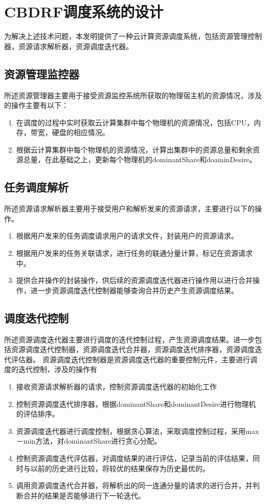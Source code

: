 \section{CBDRF调度系统的设计}
为解决上述技术问题，本发明提供了一种云计算资源调度系统，包括资源管理控制器，资源请求解析器，资源调度迭代器。

\subsection{资源管理监控器}
所述资源管理器主要用于接受资源监控系统所获取的物理宿主机的资源情况，涉及的操作主要有以下：
\begin{enumerate}
\item 在调度的过程中实时获取云计算集群中每个物理机的资源情况，包括CPU，内存，带宽，硬盘的相应情况。
\item 根据云计算集群中每个物理机的资源情况，计算出集群中的资源总量和剩余资源总量，在此基础之上，更新每个物理机的dominantShare和doaminDesire。
\end{enumerate}
\subsection{任务调度解析}
所述资源请求解析器主要用于接受用户和解析发来的资源请求，主要进行以下的操作。
\begin{enumerate}
\item 根据用户发来的任务调度请求用户的请求文件，封装用户的资源请求。
\item 根据用户发来的任务关联请求，进行任务的联通分量计算，标记在资源请求中。
\item 提供合并操作的封装操作，供后续的资源调度迭代器进行操作用以进行合并操作，进一步资源调度迭代控制器能够查询合并历史产生资源调度结果。
\end{enumerate}
\subsection{调度迭代控制}
所述资源调度迭代器主要进行调度的迭代控制过程，产生资源调度结果。进一步包括资源调度迭代控制器，资源调度迭代合并器，资源调度迭代排序器，资源调度迭代评估器。
资源调度迭代控制器是资源调度迭代器的重要控制元件，主要进行调度的迭代控制，涉及的操作有
\begin{enumerate}
\item 接收资源请求解析器的请求，控制资源调度迭代器的初始化工作
\item 控制资源调度迭代排序器，根据dominantShare和dominantDesire进行物理机的评估排序。
\item 资源调度迭代器进行调度控制，根据贪心算法，采取调度控制过程，采用max－min方法，对dominantShare进行贪心分配。
\item 控制资源调度迭代评估器，对调度结果的进行评估，记录当前的评估结果，同时与以前的历史进行比较，将较优的结果保存为历史最优的。
\item 调用资源调度迭代合并器，将解析出的同一连通分量的请求的进行合并，并判断合并的结果是否能够进行下一轮迭代。
\end{enumerate}

